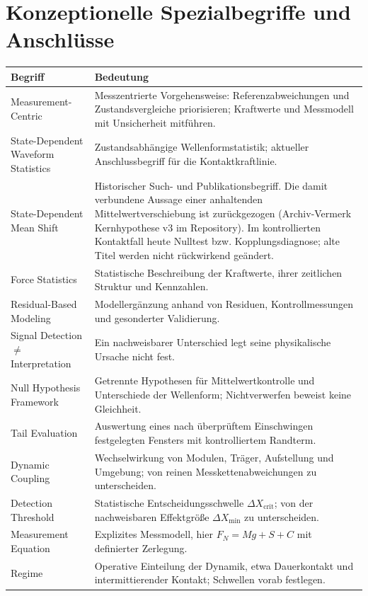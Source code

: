 \documentclass[11pt,a4paper]{article}
\begin{document}
\section{Konzeptionelle Spezialbegriffe und Anschlüsse}
\begin{longtable}{@{}L{.29\textwidth}L{.68\textwidth}@{}}
\toprule\textbf{Begriff}&\textbf{Bedeutung}\\\midrule\endhead
Measurement-Centric&Messzentrierte Vorgehensweise: Referenzabweichungen und Zustandsvergleiche priorisieren; Kraftwerte und Messmodell mit Unsicherheit mitführen.\\
State-Dependent Waveform Statistics&Zustandsabhängige Wellenformstatistik; aktueller Anschlussbegriff für die Kontaktkraftlinie.\\
State-Dependent Mean Shift&Historischer Such- und Publikationsbegriff. Die damit verbundene Aussage einer anhaltenden Mittelwertverschiebung ist zurückgezogen (Archiv-Vermerk Kernhypothese v3 im Repository). Im kontrollierten Kontaktfall heute Nulltest bzw. Kopplungsdiagnose; alte Titel werden nicht rückwirkend geändert.\\
Force Statistics&Statistische Beschreibung der Kraftwerte, ihrer zeitlichen Struktur und Kennzahlen.\\
Residual-Based Modeling&Modellergänzung anhand von Residuen, Kontrollmessungen und gesonderter Validierung.\\
Signal Detection $\ne$ Interpretation&Ein nachweisbarer Unterschied legt seine physikalische Ursache nicht fest.\\
Null Hypothesis Framework&Getrennte Hypothesen für Mittelwertkontrolle und Unterschiede der Wellenform; Nichtverwerfen beweist keine Gleichheit.\\
Tail Evaluation&Auswertung eines nach überprüftem Einschwingen festgelegten Fensters mit kontrolliertem Randterm.\\
Dynamic Coupling&Wechselwirkung von Modulen, Träger, Aufstellung und Umgebung; von reinen Messkettenabweichungen zu unterscheiden.\\
Detection Threshold&Statistische Entscheidungsschwelle $\Delta X_{\mathrm{crit}}$; von der nachweisbaren Effektgröße $\Delta X_{\min}$ zu unterscheiden.\\
Measurement Equation&Explizites Messmodell, hier $F_N=Mg+S+C$ mit definierter Zerlegung.\\
Regime&Operative Einteilung der Dynamik, etwa Dauerkontakt und intermittierender Kontakt; Schwellen vorab festlegen.\\

\end{longtable}
\end{document}
